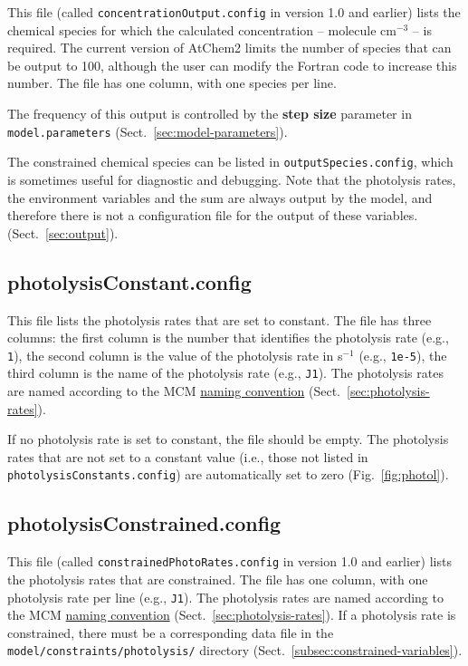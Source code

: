 This file (called \texttt{concentrationOutput.config} in version 1.0
and earlier) lists the chemical species for which the calculated
concentration -- molecule cm$^{-3}$ -- is required. The current
version of AtChem2 limits the number of species that can be output to
100, although the user can modify the Fortran code to increase this  %
number. The file has one column, with one species per line.

The frequency of this output is controlled by the \textbf{step size}
parameter in \texttt{model.parameters} (Sect.~\ref{sec:model-parameters}).

The constrained chemical species can be listed in
\texttt{outputSpecies.config}, which is sometimes useful for
diagnostic and debugging. Note that the photolysis rates, the
environment variables and the  sum are always output by the
model, and therefore there is not a configuration file for the output
of these variables.  (Sect.~\ref{sec:output}).

\subsection{photolysisConstant.config} \label{subsec:photolysisconstant}

This file lists the photolysis rates that are set to constant. The
file has three columns: the first column is the number that identifies
the photolysis rate (e.g., \texttt{1}), the second column is the value
of the photolysis rate in s$^{-1}$ (e.g., \texttt{1e-5}), the third
column is the name of the photolysis rate (e.g., \texttt{J1}). The
photolysis rates are named according to the MCM
\href{http://mcm.leeds.ac.uk/MCM/parameters/photolysis.htt}{naming convention}
(Sect.~\ref{sec:photolysis-rates}).

If no photolysis rate is set to constant, the file should be
empty. The photolysis rates that are not set to a constant value
(i.e., those not listed in \texttt{photolysisConstants.config}) are
automatically set to zero (Fig.~\ref{fig:photol}).

\subsection{photolysisConstrained.config} \label{subsec:photolysisconstrained}

This file (called \texttt{constrainedPhotoRates.config} in version 1.0
and earlier) lists the photolysis rates that are constrained. The file
has one column, with one photolysis rate per line (e.g.,
\texttt{J1}). The photolysis rates are named according to the MCM
\href{http://mcm.leeds.ac.uk/MCM/parameters/photolysis.htt}{naming convention}
(Sect.~\ref{sec:photolysis-rates}). If a photolysis rate is
constrained, there must be a corresponding data file in the
\texttt{model/constraints/photolysis/} directory
(Sect.~\ref{subsec:constrained-variables}).

